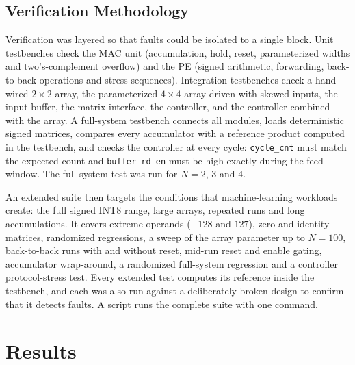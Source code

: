 \documentclass[conference]{IEEEtran}
\begin{document}
\subsection{Verification Methodology}
Verification was layered so that faults could be isolated to a single block. Unit testbenches
check the MAC unit (accumulation, hold, reset, parameterized widths and two's-complement
overflow) and the PE (signed arithmetic, forwarding, back-to-back operations and stress
sequences). Integration testbenches check a hand-wired $2\times2$ array, the parameterized
$4\times4$ array driven with skewed inputs, the input buffer, the matrix interface, the
controller, and the controller combined with the array. A full-system testbench connects all
modules, loads deterministic signed matrices, compares every accumulator with a reference
product computed in the testbench, and checks the controller at every cycle: \texttt{cycle\_cnt}
must match the expected count and \texttt{buffer\_rd\_en} must be high exactly during the feed
window. The full-system test was run for $N=2$, $3$ and $4$.

An extended suite then targets the conditions that machine-learning workloads create: the full
signed INT8 range, large arrays, repeated runs and long accumulations. It covers extreme
operands ($-128$ and $127$), zero and identity matrices, randomized regressions, a sweep of the
array parameter up to $N=100$, back-to-back runs with and without reset, mid-run reset and
enable gating, accumulator wrap-around, a randomized full-system regression and a controller
protocol-stress test. Every extended test computes its reference inside the testbench, and
each was also run against a deliberately broken design to confirm that it detects faults. A
script runs the complete suite with one command.

\section{Results}
\end{document}
